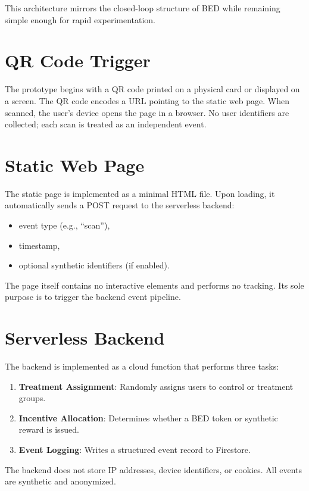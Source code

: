 This architecture mirrors the closed-loop structure of BED while remaining
simple enough for rapid experimentation.

\section{QR Code Trigger}

The prototype begins with a QR code printed on a physical card or displayed on a
screen. The QR code encodes a URL pointing to the static web page. When scanned,
the user’s device opens the page in a browser. No user identifiers are
collected; each scan is treated as an independent event.

\section{Static Web Page}

The static page is implemented as a minimal HTML file. Upon loading, it
automatically sends a POST request to the serverless backend:

\begin{itemize}
    \item event type (e.g., ``scan''),
    \item timestamp,
    \item optional synthetic identifiers (if enabled).
\end{itemize}

The page itself contains no interactive elements and performs no tracking. Its
sole purpose is to trigger the backend event pipeline.

\section{Serverless Backend}

The backend is implemented as a cloud function that performs three tasks:

\begin{enumerate}
    \item \textbf{Treatment Assignment}: Randomly assigns users to control or
    treatment groups.
    \item \textbf{Incentive Allocation}: Determines whether a BED token or
    synthetic reward is issued.
    \item \textbf{Event Logging}: Writes a structured event record to Firestore.
\end{enumerate}

The backend does not store IP addresses, device identifiers, or cookies. All
events are synthetic and anonymized.


